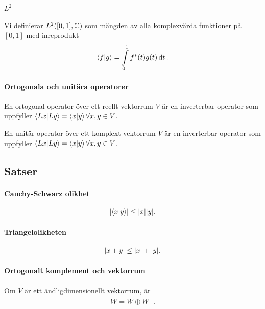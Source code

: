 \paragraph{$L^{2}$}
Vi definierar $L^{2}([0, 1], \mathbb{C})$ som mängden av alla komplexvärda funktioner på $[0, 1]$ med inreprodukt
\begin{align*}
	\bra{f}\ket{g} = \int\limits_{0}^{1}f^{*}(t)g(t)\dd{t}.
\end{align*}

\paragraph{Ortogonala och unitära operatorer}
En ortogonal operator över ett reellt vektorrum $V$ är en inverterbar operator som uppfyller $\bra{Lx}\ket{Ly} = \bra{x}\ket{y}\forall x, y\in V$.

En unitär operator över ett komplext vektorrum $V$ är en inverterbar operator som uppfyller $\bra{Lx}\ket{Ly} = \bra{x}\ket{y}\forall x, y\in V$.

\subsection{Satser}

\paragraph{Cauchy-Schwarz olikhet}

\begin{align*}
	\abs{\bra{x}\ket{y}} \leq \abs{x}\abs{y}.
\end{align*}

\proof

\paragraph{Triangelolikheten}

\begin{align*}
	\abs{x + y} \leq \abs{x} + \abs{y}.
\end{align*}

\paragraph{Ortogonalt komplement och vektorrum}
Om $V$ är ett ändligdimensionellt vektorrum, är
\begin{align*}
	W = W \oplus W^{\perp}.
\end{align*}


